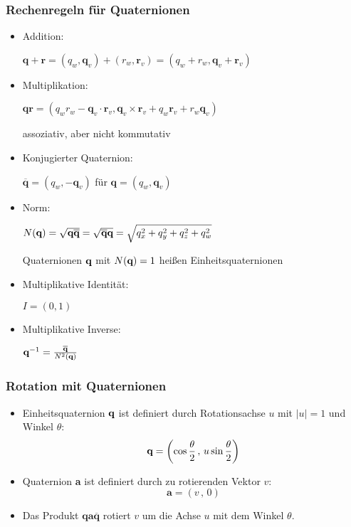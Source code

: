 \subsubsection{Rechenregeln für Quaternionen}

\begin{itemize}
	\item Addition: \\ 
	\begin{center}
	$\mathbf{q}+\mathbf{r}=(q_w,\mathbf{q}_v)+(r_w,\mathbf{r}_v)=(q_w+r_w,\mathbf{q}_v+\mathbf{r}_v)$
	\end{center}
	\item Multiplikation: \\
	\begin{center}
	$\mathbf{q} \mathbf{r}=(q_w r_w-\mathbf{q}_v \cdot \mathbf{r}_v,\mathbf{q}_v \times \mathbf{r}_v + q_w \mathbf{r}_v + r_w \mathbf{q}_v)$
	\end{center}
	assoziativ, aber nicht kommutativ
	\item Konjugierter Quaternion:
		\begin{center}
	$\overline{\mathbf{q}}=(q_w,-\mathbf{q}_v)$ für $\mathbf{q}=(q_w,\mathbf{q}_v)$
	\end{center}
	\item Norm: 
	\begin{center}
	$N(\textbf{q}) = \sqrt{\textbf{q} \overline{\textbf{q}}} = \sqrt{\overline{\textbf{q}}\textbf{q}} = \sqrt{q_x^2 + q_y^2 + q_z^2 + q_w^2}$
	\end{center}
	Quaternionen $\textbf{q}$ mit $N(\textbf{q}) = 1$ heißen Einheitsquaternionen
	\item  Multiplikative Identität: 
	\begin{center}
	$I = (0,1)$
	\end{center}
	\item Multiplikative Inverse:
	\begin{center}
	$\textbf{q}^{-1} = \frac{\overline{\textbf{q}}}{N^2(\textbf{q})}$
	\end{center}
\end{itemize}


 
\subsubsection{Rotation mit Quaternionen}
\begin{itemize}
\item Einheitsquaternion $\textbf{q}$ ist definiert durch Rotationsachse $u$ mit $|u| = 1$ und Winkel $\theta$: $$\textbf{q} = \left( \cos \frac{\theta}{2} \, , \, u \sin \frac{\theta}{2} \right)$$
\item Quaternion \textbf{a} ist definiert durch zu rotierenden Vektor $v$: $$\textbf{a} = (v \, , \, 0)$$
\item Das Produkt $\textbf{qa}\overline{\textbf{q}}$ rotiert $v$ um die Achse $u$ mit dem Winkel $\theta$.
\end{itemize}


